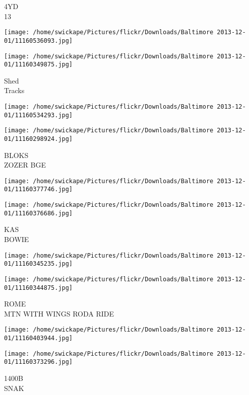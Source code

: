 \documentclass[10pt,letterpaper]{article}
\begin{document}
4YD\\
13\\
\pagebreak

\texttt{[image: /home/swickape/Pictures/flickr/Downloads/Baltimore 2013-12-01/11160536093.jpg]}

\vspace{0.25in}
\texttt{[image: /home/swickape/Pictures/flickr/Downloads/Baltimore 2013-12-01/11160349875.jpg]}

Shed\\
Tracks\\
\pagebreak

\texttt{[image: /home/swickape/Pictures/flickr/Downloads/Baltimore 2013-12-01/11160534293.jpg]}

\vspace{0.25in}
\texttt{[image: /home/swickape/Pictures/flickr/Downloads/Baltimore 2013-12-01/11160298924.jpg]}

BLOKS\\
ZOZER BGE\\
\pagebreak

\texttt{[image: /home/swickape/Pictures/flickr/Downloads/Baltimore 2013-12-01/11160377746.jpg]}

\vspace{0.25in}
\texttt{[image: /home/swickape/Pictures/flickr/Downloads/Baltimore 2013-12-01/11160376686.jpg]}

KAS\\
BOWIE\\
\pagebreak

\texttt{[image: /home/swickape/Pictures/flickr/Downloads/Baltimore 2013-12-01/11160345235.jpg]}

\vspace{0.25in}
\texttt{[image: /home/swickape/Pictures/flickr/Downloads/Baltimore 2013-12-01/11160344875.jpg]}

ROME\\
MTN WITH WINGS RODA RIDE\\
\pagebreak

\texttt{[image: /home/swickape/Pictures/flickr/Downloads/Baltimore 2013-12-01/11160403944.jpg]}

\vspace{0.25in}
\texttt{[image: /home/swickape/Pictures/flickr/Downloads/Baltimore 2013-12-01/11160373296.jpg]}

1400B\\
SNAK\\
\pagebreak
\end{document}
